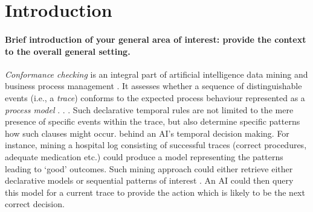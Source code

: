 \section{Introduction}

\paragraph*{Brief introduction of your general area of interest: provide the \textbf{context} to the overall general setting.} \textit{Conformance checking} is an integral part of artificial intelligence  data mining and business process management \cite{bpm21}. It assesses whether a sequence of distinguishable events (i.e., a \textit{trace}) conforms to the expected process behaviour represented as a \textit{process model} \cite{RozinatA08}.  \cite{Li2020}  \cite{AgostinelliBFMM21}. %
 \cite{bpm21}. Such declarative temporal rules are not limited to the mere presence of specific events within the trace, but also determine specific patterns how such clauses might occur.   behind an AI's temporal decision making.  For instance, mining a hospital log consisting of successful traces (correct procedures, adequate medication etc.) could produce a model representing the patterns leading to `good' outcomes. Such mining approach could either retrieve either declarative models or sequential patterns of interest \cite{mining}. An AI could then query this model for a current trace to provide the action which is likely to be the next correct decision.



